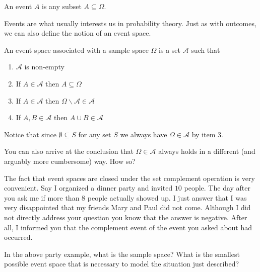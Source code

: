 \begin{Definition}[Event]
An event $ A $ is any subset $ A \subseteq \Omega $.
\end{Definition}

Events are what usually interests us in probability theory. Just as with outcomes, we can 
also define the notion of an event space.

\newpage
\begin{Definition}
An event space associated with a sample space $ \Omega $ is a set $ \mathcal{A} $ such that
\begin{enumerate}
\item $ \mathcal{A} $ is non-empty
\item If $ A \in \mathcal{A} $ then $ A \subseteq \Omega $
\item If $ A \in \mathcal{A} $ then $ \Omega\backslash \mathcal{A} \in \mathcal{A} $
\item If $ A,B \in \mathcal{A} $ then $ A \cup B \in \mathcal{A} $
\end{enumerate}
\end{Definition}

Notice that since $ \emptyset \subseteq S $ for any set $ S $ we always have $ \Omega \in \mathcal{A} $
by item 3.

\begin{Exercise} 
You can also arrive at the conclusion that $ \Omega \in \mathcal{A} $ always holds in a 
different (and arguably more cumbersome) way. How so?
\end{Exercise}

The fact that event spaces are closed under the set complement operation is very convenient. Say I
organized a dinner party and invited $ 10 $ people. The day after you ask me if more than $ 8 $ people
actually showed up. I just answer that I was very disappointed that my friends Mary and Paul did 
not come. Although I did not directly address your question you know that the answer is negative. After
all, I informed you that the complement event of the event you asked about had occurred.

\begin{Exercise} 
In the above party example, what is the sample space? What is the smallest possible event space that is necessary to
model the situation just described?
\end{Exercise}


